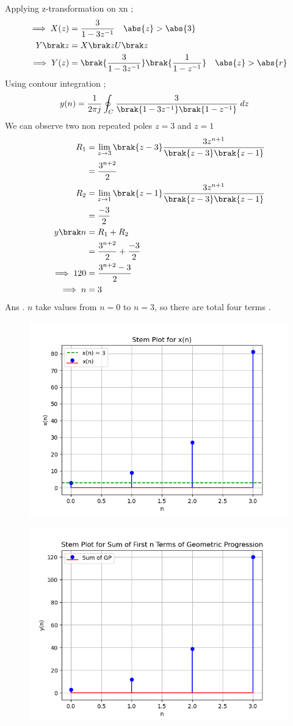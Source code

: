 \documentclass[journal,12pt,twocolumn]{IEEEtran}
\theoremstyle{remark}
\begin{document}
Applying z-transformation on x\brak n ;
\begin{align}
\implies X(z) &=\frac{3}{1-3z^{-1}} \quad \abs{z} > \abs{3}\\
Y \brak z &= X\brak zU\brak z\\
\implies Y(z)&=\brak{\frac{3}{1-3 z^{-1}}}\brak{\frac{1}{1- z^{-1}}}  \quad \abs{z} > \abs{r}
\end{align}
Using contour integration  ;
\begin{align}
   y(n) &=\frac{1}{2\pi j}\oint_{C}{\frac{3}{\brak{1-3 z^{-1}}\brak{1- z^{-1}}}}  \;dz 
\end{align}
We can observe two non repeated poles $z=3$ and $z=1$
\begin{align}
    R_1&=\lim\limits_{z\to 3} \brak{z-3} \frac{3 z^{n+1}}{\brak{z-3}\brak{z-1}}\\
  &=\frac{3^{n+2}}{2}\\
   R_2&=\lim\limits_{z\to 1} \brak{z-1} \frac{3 z^{n+1}}{\brak{z-3}\brak{z-1}}\\
  &=\frac{-3}{2}\\
  y\brak n&= R_1+R_2\\
   &=\frac{3^{n+2}}{2}+\frac{-3}{2} \\
  \implies 120&=\frac{3^{n+2}-3}{2} \\
   \implies n&=3
\end{align}
Ans . $n$ take values from $n=0$ to  $n=3$, so there are total four terms .
\newpage
\begin{figure}
   \includegraphics[width=1\linewidth]{figs/i1.png}
\end{figure}
\begin{figure}
   \includegraphics[width=1\linewidth]{figs/i2.png}
\end{figure}
\end{document}
